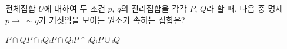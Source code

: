 전체집합 $U$에 대하여 두 조건 $p$, $q$의 진리집합을 각각 $P$, $Q$라 할 때, 다음 중 명제 $p\longrightarrow\ \sim q$가 거짓임을 보이는 원소가 속하는 집합은?
\begin{choices32}{$P\cap Q$}{$P\cap\comp{Q}$}{$\comp{P}\cap Q$}{$\comp{P}\cap\comp{Q}$}{$\comp{P}\cup\comp{Q}$}\end{choices32}
